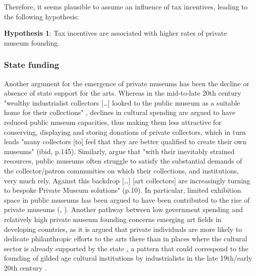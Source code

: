 \documentclass[11pt]{article}
\begin{document}
Therefore, it seems plausible to assume an influence of tax incentives, leading to the following hypothesis:

\bigbreak
\noindent
\textbf{Hypothesis 1}: Tax incentives are associated with higher rates of private museum founding.




\subsubsection*{State funding}






Another argument for the emergence of private museums has been the decline or absence of state support for the arts. 
Whereas in the mid-to-late 20th century "wealthy industrialist collectors [\ldots{}] looked to the public museum as a suitable home for their collections" \parencite[p.144]{Walker_2019_collector}, declines in cultural spending are argued to have reduced public museum capacities, thus making them less attractive for conserving, displaying and storing donations of private collectors, which in turn leads "many collectors [to] feel that they are better qualified to create their own museums" (ibid, p.145).
Similarly, \textcite{Boloten_Hacking_2021_foreword} argue that "with their inevitably strained resources, public museums often struggle to satisfy the substantial demands of the collector/patron communities on which their collections, and institutions, very much rely. Against this backdrop [\ldots{}] [art collectors] are increasingly turning to bespoke Private Museum solutions" (p.10).
In particular, limited exhibition space in public museums has been argued to have been contributed to the rise of private museums (\cite[p.217]{Walker_2019_collector}, \cite[p.1]{Zorloni_Resch_2016_opportunities}). 
Another pathway between low government spending and relatively high private museum founding concerns emerging art fields in developing countries, as it is argued that private individuals are more likely to dedicate philanthropic efforts to the arts there than in places where the cultural sector is already supported by the state \parencite{Durand_2018_jumex,Bechtler_Imhof_2018_future,Boloten_Hacking_2021_foreword}, a pattern that could correspond to the founding of gilded age cultural institutions by industrialists in the late 19th/early 20th century \parencite{diMaggio_1982_boston,Adam_2004_philanthropy}. 
\end{document}
